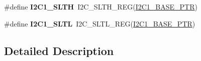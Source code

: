 \begin{DoxyCompactItemize}
\item 
\mbox{\label{group___i2_c___register___accessor___macros_ga636aa70cc9b9d94328cecb67e0005e7b}} 
\#define {\bfseries I2\+C1\+\_\+\+S\+L\+TH}~I2\+C\+\_\+\+S\+L\+T\+H\+\_\+\+R\+EG(\hyperlink{group___i2_c___peripheral_gae13da5d584f2a4e2379db927a3f18772}{I2\+C1\+\_\+\+B\+A\+S\+E\+\_\+\+P\+TR})
\item 
\mbox{\label{group___i2_c___register___accessor___macros_ga1d6d67136378cdc43250d350dde35366}} 
\#define {\bfseries I2\+C1\+\_\+\+S\+L\+TL}~I2\+C\+\_\+\+S\+L\+T\+L\+\_\+\+R\+EG(\hyperlink{group___i2_c___peripheral_gae13da5d584f2a4e2379db927a3f18772}{I2\+C1\+\_\+\+B\+A\+S\+E\+\_\+\+P\+TR})
\end{DoxyCompactItemize}


\subsection{Detailed Description}
